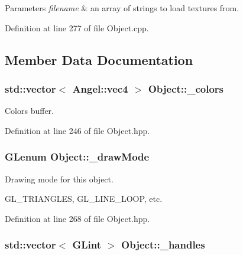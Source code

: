\begin{DoxyParams}{Parameters}
{\em filename} & an array of strings to load textures from. \\
\hline
\end{DoxyParams}


Definition at line 277 of file Object.\-cpp.



\subsection{Member Data Documentation}
\hypertarget{class_object_a29a0e9959c490067db69378bf57a17ba}{
\subsubsection[{\-\_\-colors}]{\setlength{\rightskip}{0pt plus 5cm}std\-::vector$<$ {\bf Angel\-::vec4} $>$ Object\-::\-\_\-colors}}\label{class_object_a29a0e9959c490067db69378bf57a17ba}


Colors buffer. 



Definition at line 246 of file Object.\-hpp.

\hypertarget{class_object_ae8457eabfb89d55826142508013b56c0}{
\subsubsection[{\-\_\-draw\-Mode}]{\setlength{\rightskip}{0pt plus 5cm}G\-Lenum Object\-::\-\_\-draw\-Mode\hspace{0.3cm}{\ttfamily [protected]}}}\label{class_object_ae8457eabfb89d55826142508013b56c0}


Drawing mode for this object. 

G\-L\-\_\-\-T\-R\-I\-A\-N\-G\-L\-E\-S, G\-L\-\_\-\-L\-I\-N\-E\-\_\-\-L\-O\-O\-P, etc. 

Definition at line 268 of file Object.\-hpp.

\hypertarget{class_object_a983963f564898beca4bda99676245663}{
\subsubsection[{\-\_\-handles}]{\setlength{\rightskip}{0pt plus 5cm}std\-::vector$<$ G\-Lint $>$ Object\-::\-\_\-handles\hspace{0.3cm}{\ttfamily [protected]}}}\label{class_object_a983963f564898beca4bda99676245663}


